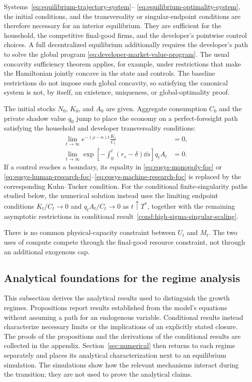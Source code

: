 Systems~\eqref{eq:equilibrium-trajectory-system}--
\eqref{eq:equilibrium-optimality-system}, the initial conditions, and the
transversality or singular-endpoint conditions are therefore necessary for an
interior equilibrium. They are sufficient for the household, the competitive
final-good firms, and the developer's pointwise control choices. A full decentralized
equilibrium additionally requires the developer's path to solve the global program
\eqref{eq:developer-market-value-program}. The usual concavity sufficiency theorem
applies, for example, under restrictions that make the Hamiltonian jointly concave in
the state and controls. The baseline restrictions do not impose such global
concavity, so satisfying the canonical system is not, by itself, an existence,
uniqueness, or global-optimality proof.

The initial stocks $N_0$, $K_0$, and $A_0$ are given. Aggregate consumption $C_0$ and the private
shadow value $q_0$ jump to place the economy on a perfect-foresight path satisfying
the household and developer transversality conditions:
\begin{align}
    \lim_{t\to\infty}
    e^{-(\rho-n)t}\frac{K_t}{C_t}&=0,
    \label{eq:household-tvc}\\
    \lim_{t\to\infty}
    \exp\!\left[-\int_0^t(r_s-\delta)\dd s\right]q_tA_t&=0.
    \label{eq:developer-tvc}
\end{align}
If a control reaches a boundary, its equality in
\eqref{eq:eqsys-monopoly-foc} or
\eqref{eq:eqsys-human-research-foc}--\eqref{eq:eqsys-machine-research-foc} is
replaced by the corresponding Kuhn--Tucker condition. For the conditional finite-singularity paths
studied below, the numerical solution instead uses the limiting endpoint conditions
$K_t/C_t\to0$ and $q_tA_t/C_t\to0$ as $t\uparrow T^*$, together with the remaining
asymptotic restrictions in conditional
result~\ref{cond:high-sigma-singular-scaling}.

There is no common physical-capacity constraint between $U_t$ and $M_t$. The two
uses of compute compete through the final-good resource constraint, not through an
additional exogenous cap.

\subsection{Analytical foundations for the regime analysis}
\label{sec:analytical-results}

This subsection derives the analytical results used to distinguish the growth
regimes. Propositions report results established from the model's equations
without assuming a path for an endogenous variable. Conditional results instead
characterize necessary limits or the implications of an explicitly stated
closure. The proofs of the propositions and the derivations of the conditional
results are collected in the appendix. Section~\ref{sec:numerical} then returns to
each regime separately and places its analytical characterization next to an
equilibrium simulation. The simulations show how the relevant mechanisms interact
during the transition; they are not used to prove the analytical claims.


